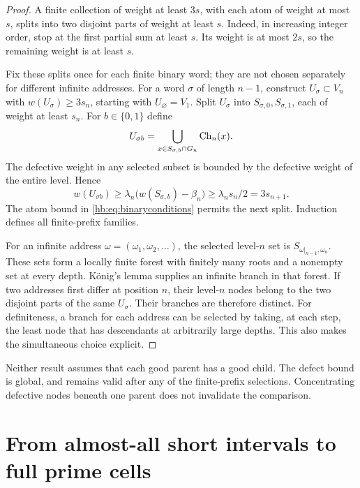 \begin{proof}
A finite collection of weight at least $3s$, with each atom of weight
at most $s$, splits into two disjoint parts of weight at least $s$.
Indeed, in increasing integer order, stop at the first partial sum
at least $s$.  Its weight is at most $2s$, so the remaining weight is
at least $s$.

Fix these splits once for each finite binary word; they are not
chosen separately for different infinite addresses.
For a word $\sigma$ of length $n-1$, construct
$U_\sigma\subset V_n$ with $w(U_\sigma)\ge3s_n$, starting with
$U_\varnothing=V_1$.  Split $U_\sigma$ into
$S_{\sigma,0},S_{\sigma,1}$, each of weight at least $s_n$.
For $b\in\{0,1\}$ define
\[
 U_{\sigma b}
   =\bigcup_{x\in S_{\sigma,b}\cap G_n}\operatorname{Ch}_n(x).
\]
The defective weight in any selected subset is bounded by the
defective weight of the entire level.  Hence
\[
 w(U_{\sigma b})
 \ge\lambda_n\bigl(w(S_{\sigma,b})-\beta_n\bigr)
 \ge\lambda_ns_n/2=3s_{n+1}.
\]
The atom bound in \eqref{hb:eq:binaryconditions} permits the next
split.  Induction defines all finite-prefix families.

For an infinite address $\omega=(\omega_1,\omega_2,\ldots)$, the
selected level-$n$ set is
$S_{\omega|_{n-1},\omega_n}$.  These sets form a locally finite
forest with finitely many roots and a nonempty set at every depth.
K\"onig's lemma supplies an infinite branch in that forest.
If two addresses first differ at position $n$, their level-$n$
nodes belong to the two disjoint parts of the same $U_\sigma$.
Their branches are therefore distinct.
For definiteness, a branch for each address can be selected by taking,
at each step, the least node that has descendants at arbitrarily
large depths.  This also makes the simultaneous choice explicit.
\end{proof}

\begin{remark}\label{hb:rem:global}
Neither result assumes that each good parent has a good child.
The defect bound is global, and remains valid after any of the
finite-prefix selections.  Concentrating defective nodes beneath
one parent does not invalidate the comparison.
\end{remark}

\section{From almost-all short intervals to full prime cells}
\label{hb:sec:cells}

